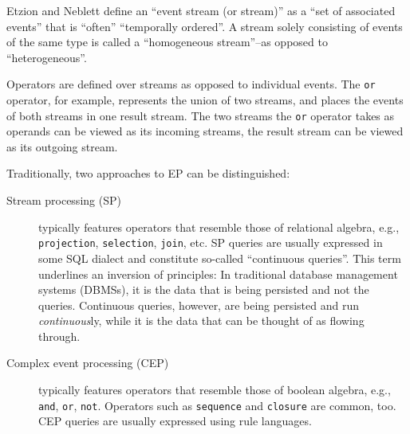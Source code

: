 \documentclass[article, type=bsc, colorback, accentcolor=tud8b, parskip=half, bibliography=totocnumbered]{tudthesis}
\begin{document}
Etzion and Neblett \cite{Etzion:2010:EPA:1894960} define an ``event stream (or stream)'' as a ``set of associated events'' that is ``often'' ``temporally ordered''.
A stream solely consisting of events of the same type is called a ``homogeneous stream''--as opposed to ``heterogeneous''.

Operators are defined over streams as opposed to individual events.
The \lstinline{or} operator, for example, represents the union of two streams, and places the events of both streams in one result stream.
The two streams the \lstinline{or} operator takes as operands can be viewed as its incoming streams, the result stream can be viewed as its outgoing stream.

Traditionally, two approaches to EP can be distinguished:

\begin{description}

\item[Stream processing (SP)]
typically features operators that resemble those of relational algebra, e.g., \lstinline{projection}, \lstinline{selection}, \lstinline{join}, etc.
SP queries are usually expressed in some SQL dialect and constitute so-called ``continuous queries''.
This term underlines an inversion of principles: In traditional database management systems (DBMSs), it is the data that is being persisted and not the queries. Continuous queries, however, are being persisted and run \emph{continuous}ly, while it is the data that can be thought of as flowing through.

\item[Complex event processing (CEP)]
typically features operators that resemble those of boolean algebra, e.g., \lstinline{and}, \lstinline{or}, \lstinline{not}.
Operators such as \lstinline{sequence} and \lstinline{closure} are common, too. CEP queries are usually expressed using rule languages.

\end{description}
\end{document}
